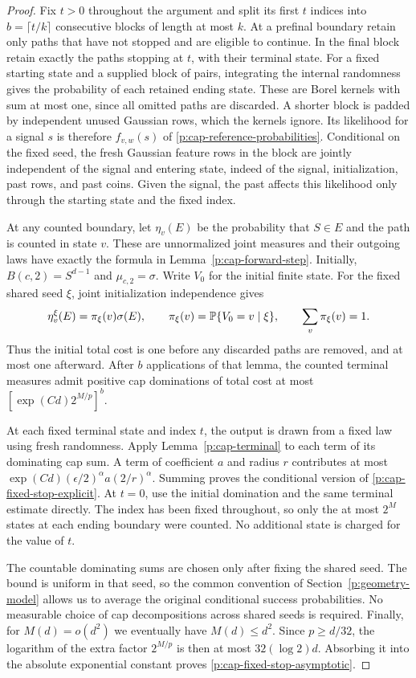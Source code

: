 \begin{proof}
Fix $t>0$ throughout the argument and split its first $t$ indices into
$b=\lceil t/k\rceil$ consecutive blocks of length at most $k$.  At a
prefinal boundary retain only paths that have not stopped and are eligible
to continue.  In the final block retain exactly the paths stopping at
$t$, with their terminal state.  For a fixed starting state and a supplied
block of pairs, integrating the internal randomness gives the probability
of each retained ending state.  These are Borel kernels with sum at most
one, since all omitted paths are discarded.  A shorter block is padded
by independent unused Gaussian rows, which the kernels ignore.  Its
likelihood for a signal $s$ is therefore $f_{v,w}(s)$ of
\eqref{p:cap-reference-probabilities}. Conditional on the fixed seed,
the fresh Gaussian feature rows in the block are jointly independent of the signal and entering state,
indeed of the signal, initialization, past rows, and past coins. Given the
signal, the past affects this likelihood only through the starting state
and the fixed index.

At any counted boundary, let $\eta_v(E)$ be the probability that
$S\in E$ and the path is counted in state $v$.  These are unnormalized
joint measures and their outgoing laws have exactly the formula in
Lemma~\ref{p:cap-forward-step}. Initially, $B(c,2)=S^{d-1}$ and
$\mu_{c,2}=\sigma$. Write $V_0$ for the initial finite state. For the
fixed shared seed $\xi$, joint initialization
independence gives
\[
 \eta_v^\xi(E)=\pi_\xi(v)\sigma(E),
 \qquad \pi_\xi(v)=\mathbb P\{V_0=v\mid\xi\},\qquad
 \sum_v\pi_\xi(v)=1.
\]
Thus the initial total cost is one before any discarded paths are removed,
and at most one afterward.
After $b$ applications of that lemma, the counted terminal measures
admit positive cap dominations of total cost at most
$[\exp(Cd)2^{M/p}]^b$.

At each fixed terminal state and index $t$, the output is drawn from a
fixed law using fresh randomness. Apply Lemma~\ref{p:cap-terminal} to each
term of its dominating cap sum.  A term of coefficient $a$ and
radius $r$ contributes at most
$\exp(Cd)(\epsilon/2)^\alpha a(2/r)^\alpha$.
Summing proves the conditional version of
\eqref{p:cap-fixed-stop-explicit}. At $t=0$, use the
initial domination and the same terminal estimate directly.  The index
has been fixed throughout, so only the at most $2^M$ states at each
ending boundary were counted.  No additional state is charged for the
value of $t$.

The countable dominating sums are chosen only after fixing the shared
seed. The bound is uniform in that seed, so the common convention of
Section~\ref{p:geometry-model} allows us to average the original
conditional success probabilities. No measurable choice of cap
decompositions across shared seeds is required.
Finally, for $M(d)=o(d^2)$ we eventually have $M(d)\le d^2$.  Since
$p\ge d/32$, the logarithm of the extra factor $2^{M/p}$ is then at
most $32(\log2)d$.  Absorbing it into the absolute exponential constant
proves \eqref{p:cap-fixed-stop-asymptotic}.
\end{proof}

